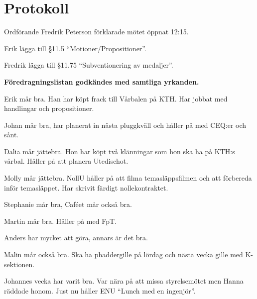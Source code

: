 \documentclass[10pt]{article}
\def\mo{Fredrik Peterson}
\begin{document}
\section*{Protokoll}
\begin{paragrafer}
Ordförande {\mo} förklarade mötet öppnat 12:15.

\valavmo

\valavms

\tosg

\ingaadj

\valavj

Erik \ypa lägga till \S11.5 ``Motioner/Propositioner''.

Fredrik \ypa lägga till \S11.75 ``Subventionering av medaljer''.

\textbf{Föredragningslistan godkändes med samtliga yrkanden.}


\begin{fyllnadsval} %
\end{fyllnadsval}

\begin{paragrafer}
Erik mår bra. Han har köpt frack till Vårbalen på KTH. Har jobbat med handlingar och propositioner.

Johan mår bra, har planerat in nästa pluggkväll och håller på med CEQ:er och sånt.

Dalia mår jättebra. Hon har köpt två klänningar som hon ska ha på KTH:s vårbal. Håller på att planera Utedischot.

Molly mår jättebra. NollU håller på att filma temasläppsfilmen och att förbereda inför temasläppet. Har skrivit färdigt nollekontraktet.

Stephanie mår bra, Caféet mår också bra.

Martin mår bra. Håller på med FpT.

Anders har mycket att göra, annars är det bra.

Malin mår också bra. Ska ha phaddergille på lördag och nästa vecka gille med K-sektionen.

Johannes vecka har varit bra. Var nära på att missa styrelsemötet men Hanna räddade honom. Just nu håller ENU ``Lunch med en ingenjör''.


\end{paragrafer}
\end{paragrafer}
\end{document}
